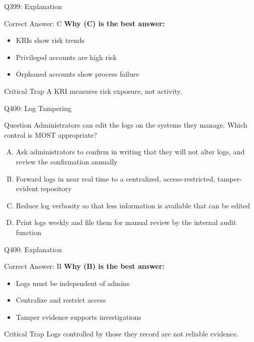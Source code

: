 \documentclass{beamer}
\begin{document}
	\begin{frame}{Q399: Explanation}
		\begin{block}{Correct Answer: C}
			\textbf{Why (C) is the best answer:}
			\begin{itemize}
				\item KRIs show risk trends
				\item Privileged accounts are high risk
				\item Orphaned accounts show process failure
			\end{itemize}
		\end{block}
		\begin{alertblock}{Critical Trap}
			A KRI measures risk exposure, not activity.
		\end{alertblock}
	\end{frame}
	
	\begin{frame}{Q400: Log Tampering}
		\begin{block}{Question}
			\small Administrators can edit the logs on the systems they manage. Which control is MOST appropriate?
		\end{block}
		\begin{enumerate}[(A)]
			\footnotesize
			\item Ask administrators to confirm in writing that they will not alter logs, and review the confirmation annually
			\item Forward logs in near real time to a centralized, access-restricted, tamper-evident repository
			\item Reduce log verbosity so that less information is available that can be edited
			\item Print logs weekly and file them for manual review by the internal audit function
		\end{enumerate}
	\end{frame}
	
	\begin{frame}{Q400: Explanation}
		\begin{block}{Correct Answer: B}
			\textbf{Why (B) is the best answer:}
			\begin{itemize}
				\item Logs must be independent of admins
				\item Centralize and restrict access
				\item Tamper evidence supports investigations
			\end{itemize}
		\end{block}
		\begin{alertblock}{Critical Trap}
			Logs controlled by those they record are not reliable evidence.
		\end{alertblock}
	\end{frame}
	
\end{document}
